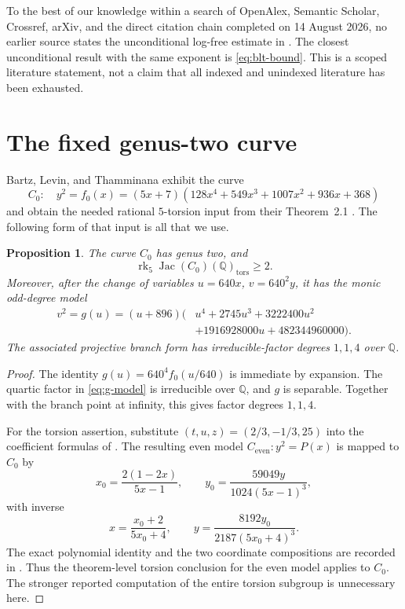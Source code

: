 \documentclass[11pt,reqno]{amsart}
\newtheorem{proposition}[theorem]{Proposition}
\theoremstyle{definition}
\theoremstyle{remark}
\newcommand{\Q}{\mathbb{Q}}
\newcommand{\Jac}{\operatorname{Jac}}
\newcommand{\rk}{\operatorname{rk}}
\begin{document}
To the best of our knowledge within a search of OpenAlex, Semantic Scholar,
Crossref, arXiv, and the direct citation chain completed on 14 August 2026,
no earlier source states the unconditional log-free estimate in
.  The closest unconditional result with the same exponent is
\eqref{eq:blt-bound}.  This is a scoped literature statement, not a claim that
all indexed and unindexed literature has been exhausted.

\section{The fixed genus-two curve}\label{sec:curve}

Bartz, Levin, and Thamminana exhibit the curve
\begin{equation}\label{eq:C0}
  C_0:\quad y^2=f_0(x)
  =(5x+7)(128x^4+549x^3+1007x^2+936x+368)
\end{equation}
and obtain the needed rational \(5\)-torsion input from their
Theorem~2.1 \cite[pp.~4--7]{BartzLevinThamminana2025}.  The following form of
that input is all that we use.

\begin{proposition}\label{prop:C0-rank}
The curve \(C_0\) has genus two, and
\[
  \rk_5\Jac(C_0)(\Q)_{\mathrm{tors}}\geq 2.
\]
Moreover, after the change of variables \(u=640x\), \(v=640^2y\), it has the
monic odd-degree model
\begin{equation}\label{eq:g-model}
\begin{aligned}
  v^2=g(u)=(u+896)\bigl(&u^4+2745u^3+3222400u^2\\
  &+1916928000u+482344960000\bigr).
\end{aligned}
\end{equation}
The associated projective branch form has irreducible-factor degrees
\(1,1,4\) over \(\Q\).
\end{proposition}

\begin{proof}
The identity \(g(u)=640^4f_0(u/640)\) is immediate by expansion.  The quartic
factor in \eqref{eq:g-model} is irreducible over \(\Q\), and \(g\) is
separable.  Together with the branch point at infinity, this gives factor
degrees \(1,1,4\).

For the torsion assertion, substitute
\((t,u,z)=(2/3,-1/3,25)\) into the coefficient formulas of
\cite[Theorem~2.1]{BartzLevinThamminana2025}.  The resulting even model
\(C_{\mathrm{even}}:y^2=P(x)\) is mapped to \(C_0\) by
\begin{equation}\label{eq:forward-map}
  x_0=\frac{2(1-2x)}{5x-1},\qquad
  y_0=\frac{59049y}{1024(5x-1)^3},
\end{equation}
with inverse
\begin{equation}\label{eq:inverse-map}
  x=\frac{x_0+2}{5x_0+4},\qquad
  y=\frac{8192y_0}{2187(5x_0+4)^3}.
\end{equation}
The exact polynomial identity and the two coordinate compositions are recorded
in .  Thus the theorem-level torsion conclusion for the even
model applies to \(C_0\).  The stronger reported computation of the entire
torsion subgroup is unnecessary here.
\end{proof}
\end{document}
